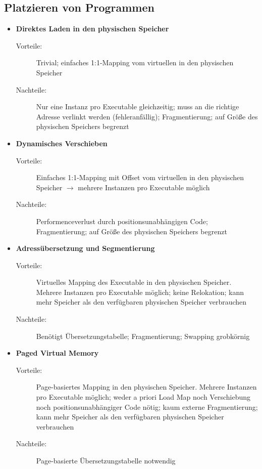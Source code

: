 \subsection{Platzieren von Programmen}
\begin{itemize}
	\item \textbf{Direktes Laden in den physischen Speicher}
	\begin{description}
		\item[Vorteile:] Trivial; einfaches 1:1-Mapping vom virtuellen in den physischen Speicher
		\item[Nachteile:] Nur eine Instanz pro Executable gleichzeitig; muss an die richtige Adresse verlinkt werden (fehleranfällig); Fragmentierung; auf Größe des physischen Speichers begrenzt
	\end{description}
	\item \textbf{Dynamisches Verschieben}
	\begin{description}
		\item[Vorteile:] Einfaches 1:1-Mapping mit Offset vom virtuellen in den physischen Speicher \(\rightarrow\) mehrere Instanzen pro Executable möglich
		\item[Nachteile:] Performenceverlust durch positionsunabhängigen Code; Fragmentierung; auf Größe des physischen Speichers begrenzt
	\end{description}
	\item \textbf{Adressübersetzung und Segmentierung}
	\begin{description}
		\item[Vorteile:] Virtuelles Mapping des Executable in den physischen Speicher. Mehrere Instanzen pro Executable möglich; keine Relokation; kann mehr Speicher als den verfügbaren physischen Speicher verbrauchen
		\item[Nachteile:] Benötigt Übersetzungstabelle; Fragmentierung; Swapping grobkörnig
	\end{description}
	\item \textbf{Paged Virtual Memory}
	\begin{description}
		\item[Vorteile:] Page-basiertes Mapping in den physischen Speicher. Mehrere Instanzen pro Executable möglich; weder a priori Load Map noch Verschiebung noch positionsunabhängiger Code nötig; kaum externe Fragmentierung; kann mehr Speicher als den verfügbaren physischen Speicher verbrauchen
		\item[Nachteile:] Page-basierte Übersetzungstabelle notwendig
	\end{description}
\end{itemize}



